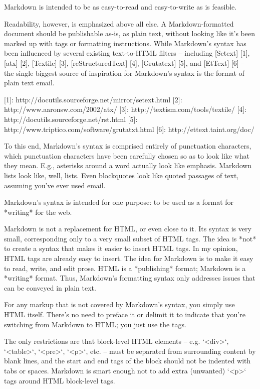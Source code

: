 Markdown is intended to be as easy-to-read and easy-to-write as is feasible.

Readability, however, is emphasized above all else. A Markdown-formatted document should be publishable as-is, as plain text, without looking like it's been marked up with tags or formatting instructions. While Markdown's syntax has been influenced by several existing text-to-HTML filters -- including [Setext] [1], [atx] [2], [Textile] [3], [reStructuredText] [4], [Grutatext] [5], and [EtText] [6] -- the single biggest source of inspiration for Markdown's syntax is the format of plain text email.

  [1]: http://docutils.sourceforge.net/mirror/setext.html
  [2]: http://www.aaronsw.com/2002/atx/
  [3]: http://textism.com/tools/textile/
  [4]: http://docutils.sourceforge.net/rst.html
  [5]: http://www.triptico.com/software/grutatxt.html
  [6]: http://ettext.taint.org/doc/

To this end, Markdown's syntax is comprised entirely of punctuation characters, which punctuation characters have been carefully chosen so as to look like what they mean. E.g., asterisks around a word actually look like \*emphasis\*. Markdown lists look like, well, lists. Even blockquotes look like quoted passages of text, assuming you've ever used email.

Markdown's syntax is intended for one purpose: to be used as a format for *writing* for the web.

Markdown is not a replacement for HTML, or even close to it. Its syntax is very small, corresponding only to a very small subset of HTML tags. The idea is *not* to create a syntax that makes it easier to insert HTML tags. In my opinion, HTML tags are already easy to insert. The idea for Markdown is to make it easy to read, write, and edit prose. HTML is a *publishing* format; Markdown is a *writing* format. Thus, Markdown's formatting syntax only addresses issues that can be conveyed in plain text.

For any markup that is not covered by Markdown's syntax, you simply use HTML itself. There's no need to preface it or delimit it to indicate that you're switching from Markdown to HTML; you just use the tags.

The only restrictions are that block-level HTML elements -- e.g. `<div>`, `<table>`, `<pre>`, `<p>`, etc. -- must be separated from surrounding content by blank lines, and the start and end tags of the block should not be indented with tabs or spaces. Markdown is smart enough not to add extra (unwanted) `<p>` tags around HTML block-level tags.


